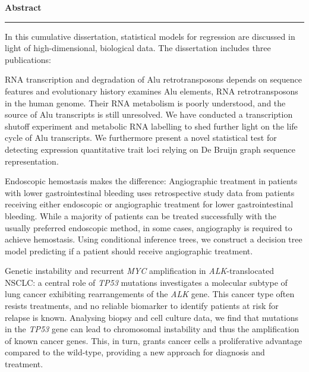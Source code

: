

\null
\vspace{\dimexpr2.3\baselineskip+1\parskip\relax}

\begingroup
  \fontsize{22}{26.4}\color{s-blue}\sffamily\bfseries
  \noindent\raggedleft Abstract\par
  \vspace*{-.5\baselineskip}
  \noindent\rule{\textwidth}{.5pt}\par\nobreak
\endgroup
\vspace{\baselineskip}

\noindent In this cumulative dissertation, statistical models for regression
are discussed in light of high-dimensional, biological data. The dissertation
includes three publications:
\medbreak

\noindent\textcolor{s-base01}{RNA transcription and degradation of Alu
retrotransposons depends on sequence features and evolutionary history}
examines Alu elements, RNA retrotransposons in the human genome. Their RNA
metabolism is poorly understood, and the source of Alu transcripts is still
unresolved. We have conducted a transcription shutoff experiment and metabolic
RNA labelling to shed further light on the life cycle of Alu transcripts. We
furthermore present a novel statistical test for detecting expression
quantitative trait loci relying on De Bruijn graph sequence representation.
\medbreak

\noindent\textcolor{s-base01}{Endoscopic hemostasis makes the difference:
Angiographic treatment in patients with lower gastrointestinal bleeding} uses
retrospective study data from patients receiving either endoscopic or
angiographic treatment for lower gastrointestinal bleeding. While a majority
of patients can be treated successfully with the usually preferred endoscopic
method, in some cases, angiography is required to achieve hemostasis. Using
conditional inference trees, we construct a decision tree model predicting if
a patient should receive angiographic treatment.
\medbreak

\noindent\textcolor{s-base01}{Genetic instability and recurrent \textit{MYC}
amplification in \textit{ALK}-translocated NSCLC: a central role of
\textit{TP53} mutations} investigates a molecular subtype of lung cancer
exhibiting rearrangements of the \textit{ALK} gene. This cancer type often
resists treatments, and no reliable biomarker to identify patients at risk for
relapse is known. Analysing biopsy and cell culture data, we find that
mutations in the \textit{TP53} gene can lead to chromosomal instability and
thus the amplification of known cancer genes. This, in turn, grants cancer
cells a proliferative advantage compared to the wild-type, providing a new
approach for diagnosis and treatment.